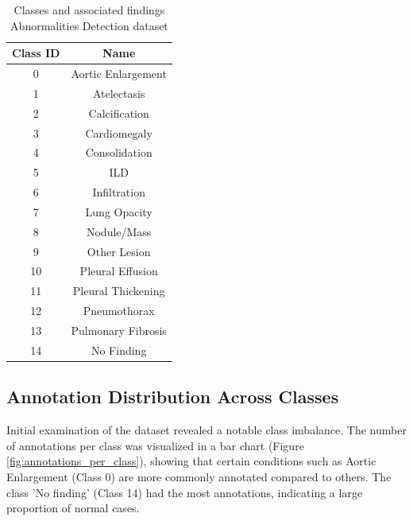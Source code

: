 \documentclass[12pt,oneside]{book} %
\begin{document}
\begin{table}
    \centering
    \begin{tabular}{|c|c|}
        \hline
        \textbf{Class ID} & \textbf{Name}      \\
        \hline
        0                 & Aortic Enlargement \\
        1                 & Atelectasis        \\
        2                 & Calcification      \\
        3                 & Cardiomegaly       \\
        4                 & Consolidation      \\
        5                 & ILD                \\
        6                 & Infiltration       \\
        7                 & Lung Opacity       \\
        8                 & Nodule/Mass        \\
        9                 & Other Lesion       \\
        10                & Pleural Effusion   \\
        11                & Pleural Thickening \\
        12                & Pneumothorax       \\
        13                & Pulmonary Fibrosis \\
        14                & No Finding         \\
        \hline
    \end{tabular}
    \caption{Classes and associated findings Abnormalities Detection dataset}
    \label{tab:classes}
\end{table}

\subsection{Annotation Distribution Across Classes}
Initial examination of the dataset revealed a notable class imbalance. The
number of annotations per class was visualized in a bar chart (Figure
\ref{fig:annotations_per_class}), showing that certain conditions such as
Aortic Enlargement (Class 0) are more commonly annotated compared to others.
The class 'No finding' (Class 14) had the most annotations, indicating a large
proportion of normal cases.
\end{document}
